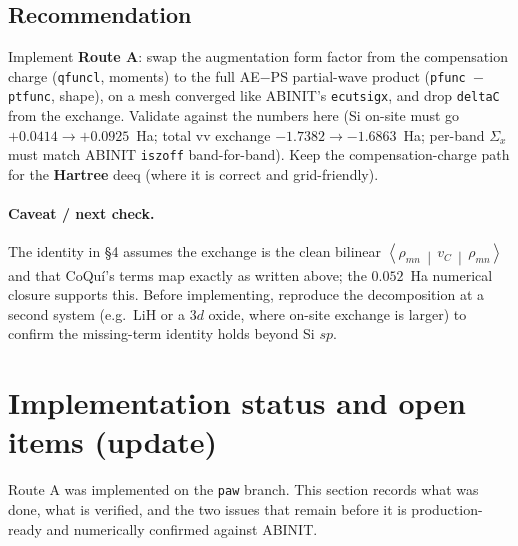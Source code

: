 \documentclass[11pt]{article}
\newcommand{\vc}{v_C}
\newcommand{\avg}[3]{\left\langle #1 \,\middle|\, #2 \,\middle|\, #3 \right\rangle}
\newcommand{\code}[1]{\texttt{\small #1}}
\begin{document}
\subsection*{Recommendation}
Implement \textbf{Route A}: swap the augmentation form factor from the compensation
charge (\code{qfuncl}, moments) to the full AE$-$PS partial-wave product
(\code{pfunc $-$ ptfunc}, shape), on a mesh converged like ABINIT's \code{ecutsigx},
and drop \code{deltaC} from the exchange. Validate against the numbers here (Si
on-site must go $+0.0414 \to +0.0925$~Ha; total vv exchange
$-1.7382 \to -1.6863$~Ha; per-band $\Sigma_x$ must match ABINIT \code{iszoff}
band-for-band). Keep the compensation-charge path for the \textbf{Hartree} deeq
(where it is correct and grid-friendly).

\paragraph{Caveat / next check.} The identity in \S4 assumes the exchange is the clean
bilinear $\avg{\rho_{mn}}{\vc}{\rho_{mn}}$ and that CoQu\'i's terms map exactly as
written above; the $0.052$~Ha numerical closure supports this. Before implementing,
reproduce the decomposition at a second system (e.g.\ LiH or a 3$d$ oxide, where
on-site exchange is larger) to confirm the missing-term identity holds beyond Si $sp$.

\section{Implementation status and open items (update)}

Route A was implemented on the \code{paw} branch. This section records what was
done, what is verified, and the two issues that remain before it is production-ready
and numerically confirmed against ABINIT.
\end{document}
